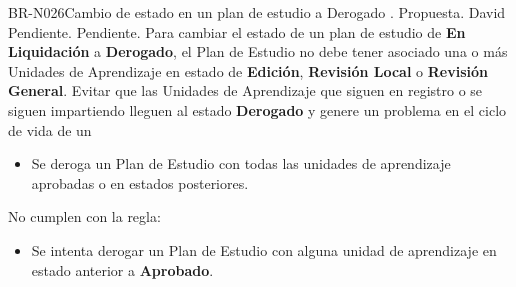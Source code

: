 \begin{BusinessRule}{BR-N026}{Cambio de estado en un plan de estudio a Derogado}
	{\bcCondition}    %
	{\btEnabler}     %
	{\blControlling}    %
	.
	\BRItem[Estado] Propuesta.
	 David
	 Pendiente.
	 Pendiente.
	\BRItem[Descripción] Para cambiar el estado de un plan de estudio de \textbf{En Liquidación} a \textbf{Derogado}, el Plan de Estudio no debe tener asociado una o más Unidades de Aprendizaje en estado de \textbf{Edición}, \textbf{Revisión Local} o \textbf{Revisión General}.
	\BRItem[Motivación] Evitar que las Unidades de Aprendizaje que siguen en registro o se siguen impartiendo lleguen al estado \textbf{Derogado} y genere un problema en el ciclo de vida de un 
	\begin{itemize}
		\item Se deroga un Plan de Estudio con todas las unidades de aprendizaje aprobadas o en estados posteriores.
	\end{itemize}
	 No cumplen con la regla:
	\begin{itemize}
		\item Se intenta derogar un Plan de Estudio con alguna unidad de aprendizaje en estado anterior a \textbf{Aprobado}.
	\end{itemize}
\end{BusinessRule}




